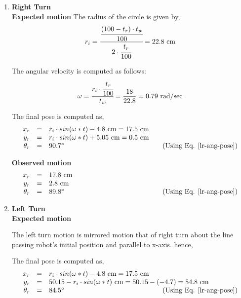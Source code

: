 \begin{enumerate}
\item \textbf{Right Turn} \\
	\textbf{Expected motion}
	\newline
	The radius of the circle is given by,
	\begin{equation}
	r_i = \cfrac{\cfrac{(100 - t_r)\cdot t_{w}}{100}}{2 \cdot \cfrac{t_{r}}{100}} = 22.8 \text{ cm}
	\label{radius-circle}
	\end{equation}
	
	The angular velocity is computed as follows:
	\begin{equation}
	\omega = \cfrac{r_i \cdot \cfrac{t_r}{100}}{t_w} = \frac{18}{22.8} = 0.79 \text{ rad/sec}
	\end{equation}
	
	The final pose is computed as,
	\begin{equation}
	\begin{array}{rcl}
	x_r &=& r_{i}\cdot sin(\omega * t) - 4.8 \text{ cm} = 17.5 \text{ cm}\\
	y_r &=& r_{i}\cdot sin(\omega * t) + 5.05 \text{ cm} = 0.5 \text{ cm} \\
	\theta_r &=& 90.7^{\circ} \hspace{5cm} \text{(Using Eq. \ref{lr-ang-pose})}
	\end{array}
	\end{equation}
	
	
	\textbf{Observed motion}
	\begin{equation}
	\begin{array}{rcl}
	x_{r} &=& 17.8 \text{ cm} \\
	y_{r} &=& 2.8 \text{ cm} \\
	\theta_r &=& 89.8^{\circ} \hspace{5cm} \text{(Using Eq. \ref{lr-ang-pose})}
	\end{array}
	\end{equation}
	
	\item \textbf{Left Turn} \\
	
	\textbf{Expected motion}
	
	The left turn motion is mirrored motion that of right turn about the line passing robot's initial position and parallel to x-axis. 
	hence,
	
	The final pose is computed as,
	\begin{equation}
	\begin{array}{rcl}
	x_r &=& r_{i}\cdot sin(\omega * t) - 4.8 \text{ cm} = 17.5 \text{ cm}\\
	y_r &=& 50.15 - r_{i}\cdot sin(\omega * t) \text{ cm} = 50.15 - (-4.7) = 54.8 \text{ cm} \\
	\theta_r &=& 84.5^{\circ} \hspace{5cm} \text{(Using Eq. \ref{lr-ang-pose})}
	\end{array}
	\end{equation}
	

\end{enumerate}
